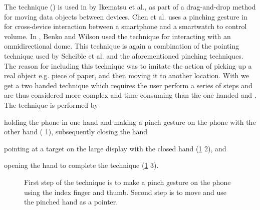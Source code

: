 The \pinch technique () is used in \cite{Ikematsu:2015} by Ikematsu et al., as part of a drag-and-drop method for moving data objects between devices.
Chen et al. uses a pinching gesture in \cite{Chen:2014} for cross-device interaction between a smartphone and a smartwatch to control volume. 
In \cite{Benko:2010}, Benko and Wilson used the \pinch technique for interacting with an omnidirectional dome.
This technique is again a combination of the pointing technique used by Scheible et al. and the aforementioned pinching techniques. 
The reason for including this technique was to imitate the action of picking up a real object e.g. piece of paper, and then moving it to another location.
With \pinch we get a two handed technique which requires the user perform a series of steps and are thus considered more complex and time consuming  than the one handed \swipe and \tilt.
The \pinch technique is performed by 
\begin{enumerate*}[label=\itshape\roman*\upshape)]
	\item{holding the phone in one hand and making a pinch gesture on the phone with the other hand ( 1), subsequently closing the hand}
	\item{pointing at a target on the large display with the closed hand (\cref{fig:pinchTechnique} 2), and}
	\item{opening the hand to complete the technique (\cref{fig:pinchTechnique} 3).}
\end{enumerate*}

\begin{figure}[H]
\caption{
	\protect{} First step of the \pinch technique is to make a pinch gesture on the phone using the index finger and thumb. Second step is to move and use the pinched hand as a pointer.
}
\label{fig:pinchTechnique}
\end{figure}


